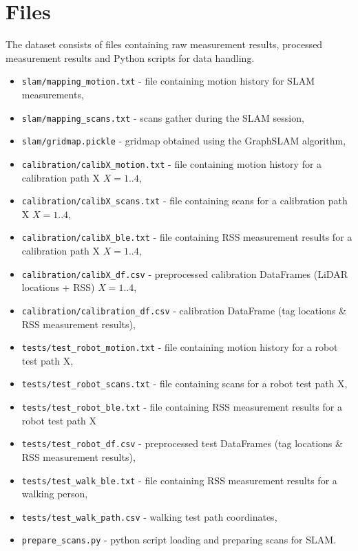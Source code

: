 \documentclass[conference]{IEEEtran}
\begin{document}
\section{Files}
The dataset consists of files containing raw measurement results, processed measurement results and Python scripts for data handling. 
\begin{itemize}
\item \texttt{slam/mapping\_motion.txt} - file containing motion history for SLAM measurements,
\item \texttt{slam/mapping\_scans.txt} - scans gather during the SLAM session,
\item \texttt{slam/gridmap.pickle} - gridmap obtained using the GraphSLAM algorithm,
\item \texttt{calibration/calibX\_motion.txt} - file containing motion history for a calibration path X $X=1..4$,
\item \texttt{calibration/calibX\_scans.txt} - file containing scans for a calibration path X $X=1..4$,
\item \texttt{calibration/calibX\_ble.txt} - file containing RSS measurement results for a calibration path X $X=1..4$,
\item \texttt{calibration/calibX\_df.csv} - preprocessed calibration DataFrames (LiDAR locations + RSS) $X=1..4$,
\item \texttt{calibration/calibration\_df.csv} - calibration DataFrame (tag locations \& RSS measurement results),
\item \texttt{tests/test\_robot\_motion.txt} - file containing motion history for a robot test path X,
\item \texttt{tests/test\_robot\_scans.txt} - file containing scans for a robot test path X,
\item \texttt{tests/test\_robot\_ble.txt} - file containing RSS measurement results for a robot test path X
\item \texttt{tests/test\_robot\_df.csv} - preprocessed test DataFrames (tag locations \& RSS measurement results),
\item \texttt{tests/test\_walk\_ble.txt} - file containing RSS measurement results for a walking person,
\item \texttt{tests/test\_walk\_path.csv} - walking test path coordinates,


\item \texttt{prepare\_scans.py} - python script loading and preparing scans for SLAM.
\end{itemize} 
\end{document}
